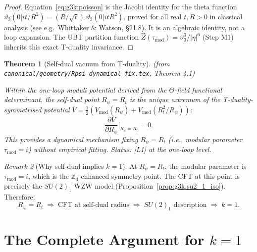 \documentclass[12pt,a4paper]{article}
\newtheorem{theorem}{Theorem}[section]
\theoremstyle{definition}
\theoremstyle{remark}
\newtheorem{remark}[theorem]{Remark}
\begin{document}
\begin{proof}
Equation~\eqref{eq:g3k:poisson} is the Jacobi identity for the theta function
$\vartheta_3(0|it/R^2) = (R/\sqrt{t})\,\vartheta_3(0|itR^2)$, proved for all
real $t, R > 0$ in classical analysis (see e.g.\ Whittaker \& Watson, §21.8).
It is an algebraic identity, not a loop expansion.  The UBT partition function
$\hat{Z}(\tau_{\mathrm{mod}}) = \vartheta_3^3/|\eta|^6$ (Step M1) inherits
this exact T-duality invariance.
\end{proof}

\begin{theorem}[Self-dual vacuum from T-duality]
\label{thm:g3k:selfdual}
\textup{(from \texttt{canonical/geometry/Rpsi\_dynamical\_fix.tex},
Theorem 4.1)}

Within the one-loop moduli potential derived from the $\Theta$-field
functional determinant, the self-dual point $R_\psi = R_t$ is the unique
extremum of the T-duality-symmetrised potential
$\bar{V} = \tfrac{1}{2}(V_{\mathrm{mod}}(R_\psi) + V_{\mathrm{mod}}(R_t^2/R_\psi))$:
\begin{equation}
  \frac{\partial \bar{V}}{\partial R_\psi}\bigg|_{R_\psi = R_t} = 0.
  \label{eq:g3k:Vbar_extremum}
\end{equation}
This provides a dynamical mechanism fixing $R_\psi = R_t$ (i.e., modular parameter
$\tau_{\mathrm{mod}} = i$) without empirical fitting.
Status: [L1] at the one-loop level.
\end{theorem}

\begin{remark}[Why self-dual implies $k = 1$]
At $R_\psi = R_t$, the modular parameter is $\tau_{\mathrm{mod}} = i$, which is the
$\mathbb{Z}_4$-enhanced symmetry point.  The CFT at this point is precisely the
$SU(2)_1$ WZW model (Proposition~\ref{prop:g3k:su2_1_iso}).  Therefore:
\begin{equation}
  R_\psi = R_t
  \;\Longrightarrow\;
  \text{CFT at self-dual radius}
  \;\Longrightarrow\;
  SU(2)_1\text{ description}
  \;\Longrightarrow\;
  k = 1.
  \label{eq:g3k:chain_k1}
\end{equation}
\end{remark}

\section{The Complete Argument for $k = 1$}
\label{sec:g3k:proof}
\end{document}
